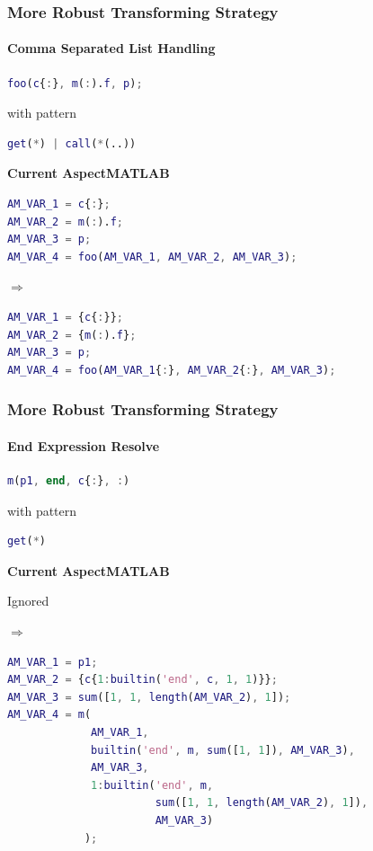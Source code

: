 \documentclass[10pt]{beamer}
\begin{document}
\begin{frame}[fragile]
\frametitle{More Robust Transforming Strategy}
\framesubtitle{Comma Separated List Handling}
\begin{lstlisting}[basicstyle=\small, language=MATLAB]
foo(c{:}, m(:).f, p);
\end{lstlisting}
with pattern
\begin{lstlisting}[basicstyle=\small, language=MATLAB]
get(*) | call(*(..))
\end{lstlisting}

\textbf{Current AspectMATLAB}
\begin{lstlisting}[basicstyle=\small, language=MATLAB]
AM_VAR_1 = c{:};
AM_VAR_2 = m(:).f;
AM_VAR_3 = p;
AM_VAR_4 = foo(AM_VAR_1, AM_VAR_2, AM_VAR_3);
\end{lstlisting}
$\Rightarrow$
\begin{lstlisting}[basicstyle=\small, language=MATLAB]
AM_VAR_1 = {c{:}};
AM_VAR_2 = {m(:).f};
AM_VAR_3 = p;
AM_VAR_4 = foo(AM_VAR_1{:}, AM_VAR_2{:}, AM_VAR_3);
\end{lstlisting}
\end{frame}

\begin{frame}[fragile]
\frametitle{More Robust Transforming Strategy}
\framesubtitle{End Expression Resolve}
\begin{lstlisting}[basicstyle=\small, language=MATLAB]
m(p1, end, c{:}, :)
\end{lstlisting}
with pattern
\begin{lstlisting}[basicstyle=\small, language=MATLAB]
get(*)
\end{lstlisting}

\textbf{Current AspectMATLAB}

Ignored

$\Rightarrow$

\begin{lstlisting}[basicstyle=\small, language=MATLAB]
AM_VAR_1 = p1;
AM_VAR_2 = {c{1:builtin('end', c, 1, 1)}};
AM_VAR_3 = sum([1, 1, length(AM_VAR_2), 1]);
AM_VAR_4 = m(
             AM_VAR_1, 
             builtin('end', m, sum([1, 1]), AM_VAR_3),
             AM_VAR_3,
             1:builtin('end', m, 
                       sum([1, 1, length(AM_VAR_2), 1]), 
                       AM_VAR_3)
            );
\end{lstlisting}
\end{frame}
\end{document}
